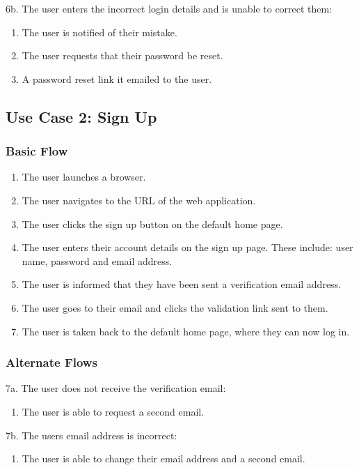 \documentclass[12pt,onecolumn]{article}
\begin{document}
		6b. The user enters the incorrect login details and is unable to correct them:

		\begin{enumerate}
			\item The user is notified of their mistake.

			\item The user requests that their password be reset.

			\item A password reset link it emailed to the user.
		\end{enumerate}

	\subsection{Use Case 2: Sign Up}

		\subsubsection{Basic Flow}

		\begin{enumerate}
			\item The user launches a browser.

			\item The user navigates to the URL of the web application.

			\item The user clicks the sign up button on the default home page.

			\item The user enters their account details on the sign up page. These include: user name, password and email address.

			\item The user is informed that they have been sent a verification email address.

			\item The user goes to their email and clicks the validation link sent to them.

			\item The user is taken back to the default home page, where they can now log in.

		\end{enumerate}

		\subsubsection{Alternate Flows}

		7a. The user does not receive the verification email:

		\begin{enumerate}
			\item The user is able to request a second email.
		\end{enumerate}

		7b. The users email address is incorrect:

		\begin{enumerate}
			\item The user is able to change their email address and a second email.
		\end{enumerate}
\end{document}
